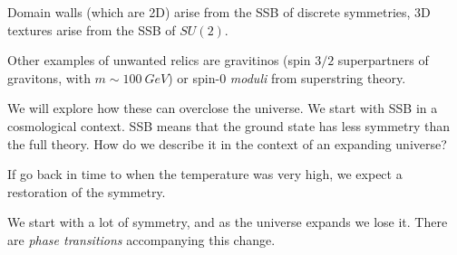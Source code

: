 \documentclass[main.tex]{subfiles}
\begin{document}
Domain walls (which are 2D) arise from the SSB of discrete symmetries, 3D textures arise from the SSB of \(SU(2)\).

Other examples of unwanted relics are gravitinos (spin \(3/2\) superpartners of gravitons, with \(m \sim \SI{100}{GeV}\)) or spin-0 \emph{moduli} from superstring theory. 

We will explore how these can overclose the universe.  
We start with SSB in a cosmological context. 
SSB means that the ground state has less symmetry than the full theory.
How do we describe it in the context of an expanding universe?

If go back in time to when the temperature was very high, we expect a restoration of the symmetry. 

We start with a lot of symmetry, and as the universe expands we lose it. There are \emph{phase transitions} accompanying this change. 
\end{document}
